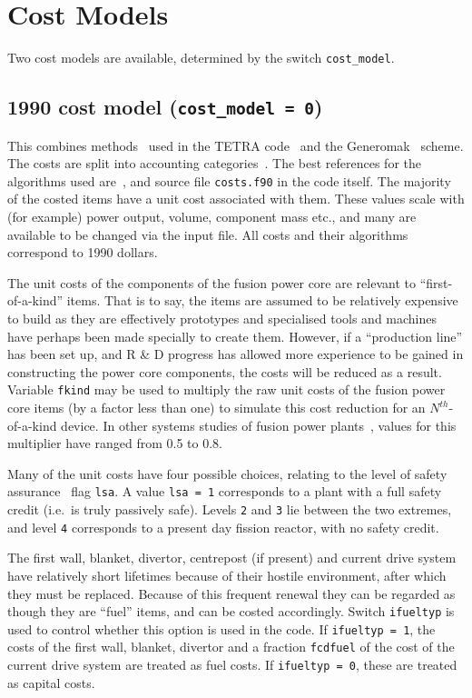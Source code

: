 \documentclass[11pt,a4paper]{report}
\begin{document}
\section{Cost Models}

Two cost models are available, determined by the switch \texttt{cost\_model}.

\subsection{1990 cost model (\texttt{cost\_model = 0})}

This combines methods~\cite{cost1} used in the TETRA code~\cite{tetra} and the Generomak~\cite{generomak} scheme.  The
costs are split into accounting categories~\cite{cost2}. The best references for the algorithms used are~\cite{storac}, and source file \texttt{costs.f90} in the code itself. The majority of the costed items have a unit cost associated with them. These values scale with (for example) power output, volume, component mass etc., and many are available to be changed via the input file. All costs and their algorithms correspond to 1990 dollars.

The unit costs of the components of the fusion power core are relevant to ``first-of-a-kind'' items. That is to say, the items are assumed to be relatively expensive to build as they are effectively prototypes and specialised tools and machines have perhaps been made specially to create them. However, if a ``production line'' has been set up, and R \& D progress has allowed more experience to be gained in constructing the power core components, the costs will be reduced as a result. Variable \texttt{fkind} may be used to multiply the raw unit costs of the fusion power core items (by a
factor less than one) to simulate this cost reduction for an $N^{th}$-of-a-kind device. In other systems studies of fusion power plants~\cite{galambos}, values for this multiplier have ranged from 0.5 to 0.8.

Many of the unit costs have four possible choices, relating to the level of safety assurance~\cite{lsa} flag \texttt{lsa}. A value \texttt{lsa = 1} corresponds to a plant with a full safety credit (i.e.\ is truly passively safe). Levels \texttt{2} and \texttt{3} lie between the two extremes, and level \texttt{4} corresponds to a present day fission reactor, with no safety credit.

The first wall, blanket, divertor, centrepost (if present) and current drive system have relatively short lifetimes because of their hostile environment, after which they must be replaced. Because of this frequent renewal they can be regarded as though they are ``fuel'' items, and can be costed accordingly. Switch \texttt{ifueltyp} is used to control whether this option is used in the code. If \texttt{ifueltyp = 1}, the costs of the first wall, blanket, divertor and a fraction \texttt{fcdfuel} of the cost of the current drive system are treated as fuel costs. If \texttt{ifueltyp = 0}, these are treated as capital costs.
\end{document}
